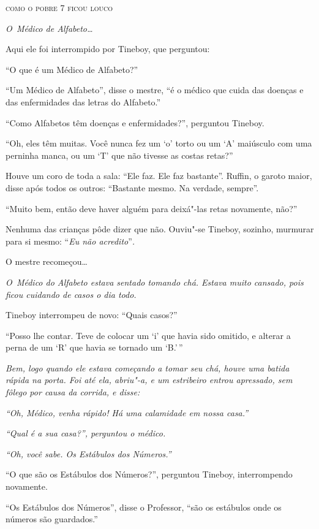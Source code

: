\textsc{como o pobre 7 ficou louco}


\emph{O~Médico de Alfabeto\ldots{}}

Aqui ele foi interrompido por Tineboy, que perguntou:

``O que é um Médico de Alfabeto?''

``Um Médico de Alfabeto'', disse o mestre, ``é o médico que cuida das
doenças e das enfermidades das letras do Alfabeto.''


``Como Alfabetos têm doenças e enfermidades?'', perguntou Tineboy.


``Oh, eles têm muitas. Você nunca fez um `o' torto ou um `A' maiúsculo
com uma perninha manca, ou um `T' que não tivesse as costas retas?''

Houve um coro de toda a sala: ``Ele faz. Ele faz bastante''. Ruffin, o
garoto maior, disse após todos os outros: ``Bastante mesmo. Na verdade,
sempre''.

``Muito bem, então deve haver alguém para deixá"-las retas novamente,
não?''

Nenhuma das crianças pôde dizer que não. Ouviu"-se Tineboy, sozinho,
murmurar para si mesmo: ``\emph{Eu não acredito}''\emph{.}

O mestre recomeçou\ldots{}

\emph{O~Médico do Alfabeto estava sentado tomando chá. Estava muito
cansado, pois ficou cuidando de casos o dia todo.}

Tineboy interrompeu de novo: ``Quais casos?''

``Posso lhe contar. Teve de colocar um `i' que havia sido omitido, e
alterar a perna de um `R' que havia se tornado um `B.'\,''

\emph{Bem, logo quando ele estava começando a tomar seu chá, houve uma
batida rápida na porta. Foi até ela, abriu"-a, e um estribeiro entrou
apressado, sem fôlego por causa da corrida, e disse:}

\emph{``Oh, Médico, venha rápido! Há uma calamidade em nossa casa.''}

\emph{``Qual é a sua casa?'', perguntou o médico.}

\emph{``Oh, você sabe. Os Estábulos dos Números.''}

``O que são os Estábulos dos Números?'', perguntou Tineboy,
interrompendo novamente.

``Os Estábulos dos Números'', disse o Professor, ``são os estábulos onde
os números são guardados.''

